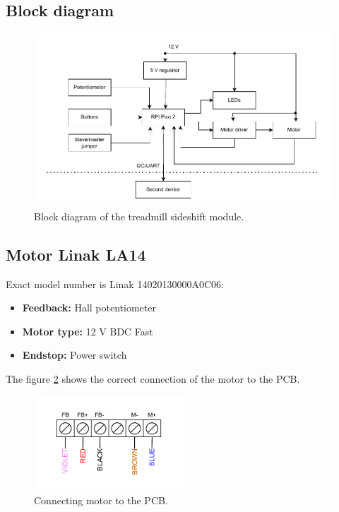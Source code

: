\subsection{Block diagram}
\begin{figure}[h!]
    \centering
    \includegraphics[width=\textwidth]{images/Sideshift-block-diagram.pdf}
    \caption{Block diagram of the treadmill sideshift module.}
    \label{fig:sideshift-block-diagram}
\end{figure}

\subsection{Motor Linak LA14}
Exact model number is Linak 14020130000A0C06:
\begin{itemize}
    \item \textbf{Feedback:} Hall potentiometer
    \item \textbf{Motor type:} 12 V BDC Fast
    \item \textbf{Endstop:} Power switch 
\end{itemize}
The figure \ref{fig:motor_connect} shows the correct connection of the motor to the PCB.
\begin{figure}[h!]
    \centering
    \includegraphics[width=0.5\textwidth]{images/motor_wiring.drawio.pdf}
    \caption{Connecting motor to the PCB.}
    \label{fig:motor_connect}
\end{figure}

